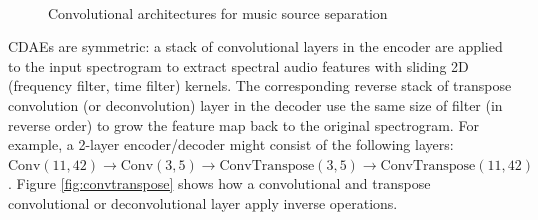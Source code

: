 \documentclass[report.tex]{subfiles}
\begin{document}
\begin{figure}[ht]
	\centering
	\\
	\caption{Convolutional architectures for music source separation}
	\label{fig:cdaes}
\end{figure}

CDAEs are symmetric: a stack of convolutional layers in the encoder are applied to the input spectrogram to extract spectral audio features with sliding 2D (frequency filter, time filter) kernels. The corresponding reverse stack of transpose convolution (or deconvolution) layer in the decoder use the same size of filter (in reverse order) to grow the feature map back to the original spectrogram. For example, a 2-layer encoder/decoder might consist of the following layers: $\text{Conv}(11,42) \rightarrow \text{Conv}(3,5) \rightarrow \text{ConvTranspose}(3,5) \rightarrow \text{ConvTranspose}(11,42)$. Figure \ref{fig:convtranspose} shows how a convolutional and transpose convolutional or deconvolutional layer apply inverse operations.
\end{document}
